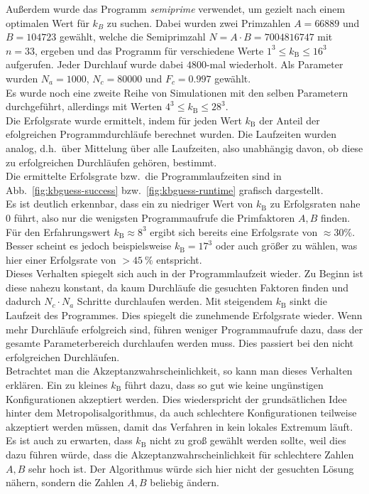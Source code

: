 Außerdem wurde das Programm \textit{semiprime} verwendet, um gezielt nach einem optimalen Wert für $k_B$ zu suchen. Dabei wurden zwei Primzahlen $A=66889$ und $B=104723$ gewählt, welche die Semiprimzahl $N=A\cdot B=7004816747$ mit $n=33$, ergeben und das Programm für verschiedene Werte $1^3\leq k_\mathrm{B}\leq 16^3$ aufgerufen. Jeder Durchlauf wurde dabei $4800$-mal wiederholt. Als Parameter wurden $N_a=1000$, $N_c=80000$ und $F_c=0.997$ gewählt. \\
Es wurde noch eine zweite Reihe von Simulationen mit den selben Parametern durchgeführt, allerdings mit Werten $4^3\leq k_\mathrm{B} \leq 28^3$. \\
Die Erfolgsrate wurde ermittelt, indem für jeden Wert $k_\mathrm{B}$ der Anteil der efolgreichen Programmdurchläufe berechnet wurden. Die Laufzeiten wurden analog, d.h.\ über Mittelung über alle Laufzeiten, also unabhängig davon, ob diese zu erfolgreichen Durchläufen gehören, bestimmt.\\
Die ermittelte Erfolsgrate bzw.\ die Programmlaufzeiten sind in Abb.~\ref{fig:kbguess-success} bzw.~\ref{fig:kbguess-runtime} grafisch dargestellt. \\
Es ist deutlich erkennbar, dass ein zu niedriger Wert von $k_\mathrm{B}$ zu Erfolgsraten nahe $0$ führt, also nur die wenigsten Programmaufrufe die Primfaktoren $A,B$ finden. Für den Erfahrungswert $k_\mathrm{B}\approx 8^3$ ergibt sich bereits eine Erfolgsrate von $\approx30\%$. Besser scheint es jedoch beispielsweise $k_\mathrm{B}=17^3$ oder auch größer zu wählen, was hier einer Erfolgsrate von $>\SI{45}{\percent}$ entspricht. \\
Dieses Verhalten spiegelt sich auch in der Programmlaufzeit wieder. Zu Beginn ist diese nahezu konstant, da kaum Durchläufe die gesuchten Faktoren finden und dadurch $N_c\cdot N_a$ Schritte durchlaufen werden. Mit steigendem $k_\mathrm{B}$ sinkt die Laufzeit des Programmes. Dies spiegelt die zunehmende Erfolgsrate wieder. Wenn mehr Durchläufe erfolgreich sind, führen weniger Programmaufrufe dazu, dass der gesamte Parameterbereich durchlaufen werden muss. Dies passiert bei den nicht erfolgreichen Durchläufen. \\
Betrachtet man die Akzeptanzwahrscheinlichkeit, so kann man dieses Verhalten erklären. Ein zu kleines $k_\mathrm{B}$ führt dazu, dass so gut wie keine ungünstigen Konfigurationen akzeptiert werden. Dies wiederspricht der grundsätlichen Idee hinter dem Metropolisalgorithmus, da auch schlechtere Konfigurationen teilweise akzeptiert werden müssen, damit das Verfahren in kein lokales Extremum läuft. Es ist auch zu erwarten, dass $k_\mathrm{B}$ nicht zu groß gewählt werden sollte, weil dies dazu führen würde, dass die Akzeptanzwahrscheinlichkeit für schlechtere Zahlen $A, B$ sehr hoch ist. Der Algorithmus würde sich hier nicht der gesuchten Lösung nähern, sondern die Zahlen $A, B$ beliebig ändern. \\
